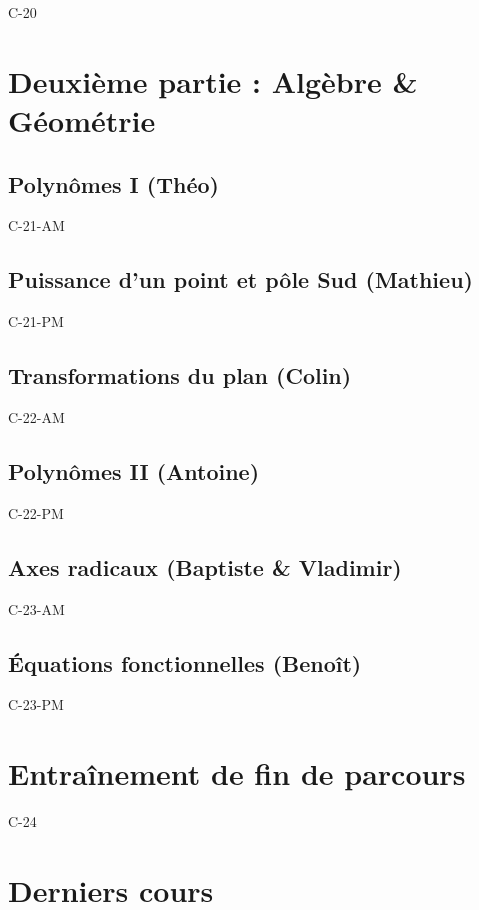 \documentclass[poly,trombi]{valbonne}
\begin{document}
{C-20}


\section{Deuxième partie : Algèbre \& Géométrie}

\subsection{Polynômes I (Théo)}

{C-21-AM}

\subsection{Puissance d'un point et pôle Sud (Mathieu)}

{C-21-PM}

\subsection{Transformations du plan (Colin)}

{C-22-AM}

\subsection{Polynômes II (Antoine)}

{C-22-PM}

\subsection{Axes radicaux (Baptiste \& Vladimir)}

{C-23-AM}

\subsection{Équations fonctionnelles (Benoît)}

{C-23-PM}


\section{Entraînement de fin de parcours}

{C-24}


\section{Derniers cours}
\end{document}
